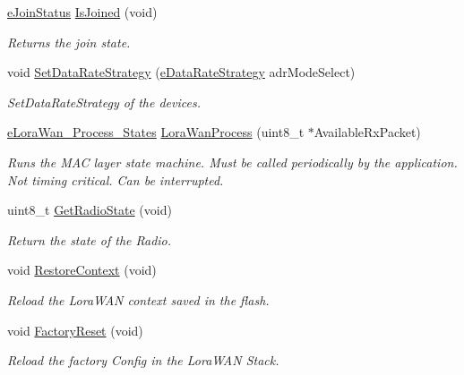 \begin{DoxyCompactItemize}
\mbox{\hyperlink{_define_8h_abe3daafdb4fec314926c12003b3ad390}{e\+Join\+Status}} \mbox{\hyperlink{class_lora_wan_object_a0dc910d02d115bea5900567001fd2b77}{Is\+Joined}} (void)
\begin{DoxyCompactList}\small\item\em Returns the join state. \end{DoxyCompactList}\item 
void \mbox{\hyperlink{class_lora_wan_object_abcb65e077d41cd395030e7679d8c4e3c}{Set\+Data\+Rate\+Strategy}} (\mbox{\hyperlink{_define_8h_a1287040ce87452e6c780ec0917441aea}{e\+Data\+Rate\+Strategy}} adr\+Mode\+Select)
\begin{DoxyCompactList}\small\item\em Set\+Data\+Rate\+Strategy of the devices. \end{DoxyCompactList}\item 
\mbox{\hyperlink{_define_8h_acabcd539e4bcc6575c90bd7d857b21f4}{e\+Lora\+Wan\+\_\+\+Process\+\_\+\+States}} \mbox{\hyperlink{class_lora_wan_object_aa833aaa609033491d4b8566bc93851cf}{Lora\+Wan\+Process}} (uint8\+\_\+t $\ast$Available\+Rx\+Packet)
\begin{DoxyCompactList}\small\item\em Runs the M\+AC layer state machine. Must be called periodically by the application. Not timing critical. Can be interrupted. \end{DoxyCompactList}\item 
uint8\+\_\+t \mbox{\hyperlink{class_lora_wan_object_a3f4c1635a946635fdffa4af569ce5f27}{Get\+Radio\+State}} (void)
\begin{DoxyCompactList}\small\item\em Return the state of the Radio. \end{DoxyCompactList}\item 
void \mbox{\hyperlink{class_lora_wan_object_a29662757556ca754ab1b314efd350a6c}{Restore\+Context}} (void)
\begin{DoxyCompactList}\small\item\em Reload the Lora\+W\+AN context saved in the flash. \end{DoxyCompactList}\item 
void \mbox{\hyperlink{class_lora_wan_object_ae3a51c4f4f4e9cbac50f65f77ad8b9cc}{Factory\+Reset}} (void)
\begin{DoxyCompactList}\small\item\em Reload the factory Config in the Lora\+W\+AN Stack. \end{DoxyCompactList}\item 

\end{DoxyCompactItemize}
